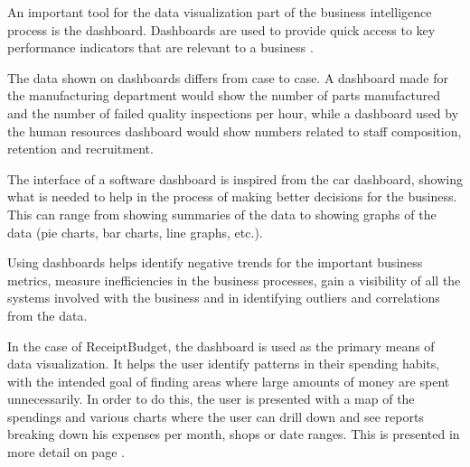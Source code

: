 An important tool for the data visualization part of the business intelligence process is the dashboard. Dashboards are used to provide quick access to key performance indicators that are relevant to a business \cite{alexander2013excel}. 

The data shown on dashboards differs from case to case. A dashboard made for the manufacturing department would show the number of parts manufactured and the number of failed quality inspections per hour, while a dashboard used by the human resources dashboard would show numbers related to staff composition, retention and recruitment. 

The interface of a software dashboard is inspired from the car dashboard, showing what is needed to help in the process of making better decisions for the business. This can range from showing summaries of the data to showing graphs of the data (pie charts, bar charts, line graphs, etc.).

Using dashboards helps identify negative trends for the important business metrics, measure inefficiencies in the business processes, gain a visibility of all the systems involved with the business and in identifying outliers and correlations from the data. 

In the case of ReceiptBudget, the dashboard is used as the primary means of data visualization. It helps the user identify patterns in their spending habits, with the intended goal of finding areas where large amounts of money are spent unnecessarily. In order to do this, the user is presented with a map of the spendings and various charts where the user can drill down and see reports breaking down his expenses per month, shops or date ranges. This is presented in more detail on page \pageref{sec:manual}.